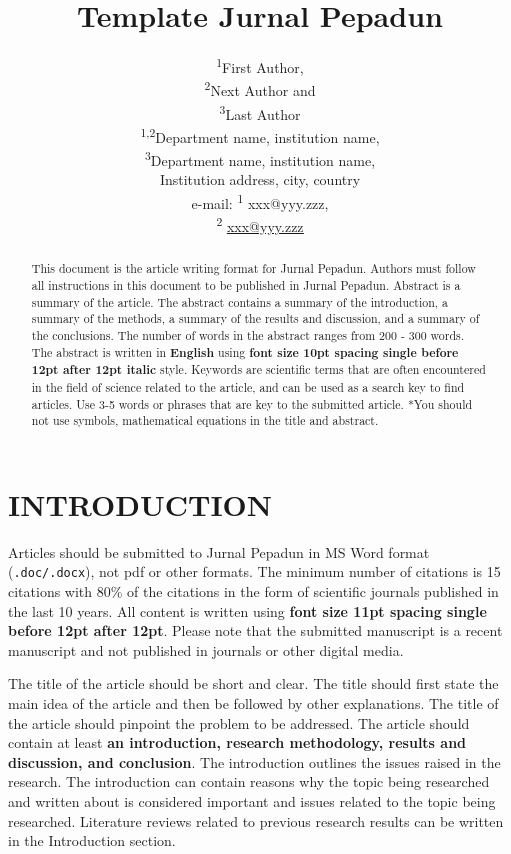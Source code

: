 \documentclass[11pt]{article}
\title{Template Jurnal Pepadun}
\author{%
    \begin{tabular}{c}
        \textsuperscript{1}First Author, \\
        \textsuperscript{2}Next Author and \\
        \textsuperscript{3}Last Author \\[6pt]
        \textsuperscript{1,2}Department name, institution name, \\
        \textsuperscript{3}Department name, institution name, \\ 
        Institution address, city, country \\[6pt]
        e-mail: \textsuperscript{1} xxx@yyy.zzz, \\
        \textsuperscript{2} \href{mailto:xxx@yyy.zzz}{\uline{xxx@yyy.zzz}}
    \end{tabular}%
}
\date{} %
\begin{document}
\maketitle

\begin{abstract}
This document is the article writing format for Jurnal Pepadun. Authors must follow all instructions in this document to be published in Jurnal Pepadun. Abstract is a summary of the article. The abstract contains a summary of the introduction, a summary of the methods, a summary of the results and discussion, and a summary of the conclusions. The number of words in the abstract ranges from 200 - 300 words. The abstract is written in \textbf{English} using \textbf{font size 10pt spacing single before 12pt after 12pt italic} style. Keywords are scientific terms that are often encountered in the field of science related to the article, and can be used as a search key to find articles. Use 3-5 words or phrases that are key to the submitted article. *You should not use symbols, mathematical equations in the title and abstract.
\end{abstract}


\section{INTRODUCTION}

Articles should be submitted to Jurnal Pepadun in MS Word format (\texttt{.doc/.docx}), not pdf or other formats. The minimum number of citations is 15 citations with 80\% of the citations in the form of scientific journals published in the last 10 years. All content is written using \textbf{font size 11pt spacing single before 12pt after 12pt}. Please note that the submitted manuscript is a recent manuscript and not published in journals or other digital media.

The title of the article should be short and clear. The title should first state the main idea of the article and then be followed by other explanations. The title of the article should pinpoint the problem to be addressed. The article should contain at least \textbf{an introduction, research methodology, results and discussion, and conclusion}. The introduction outlines the issues raised in the research. The introduction can contain reasons why the topic being researched and written about is considered important and issues related to the topic being researched. Literature reviews related to previous research results can be written in the Introduction section.
\end{document}

